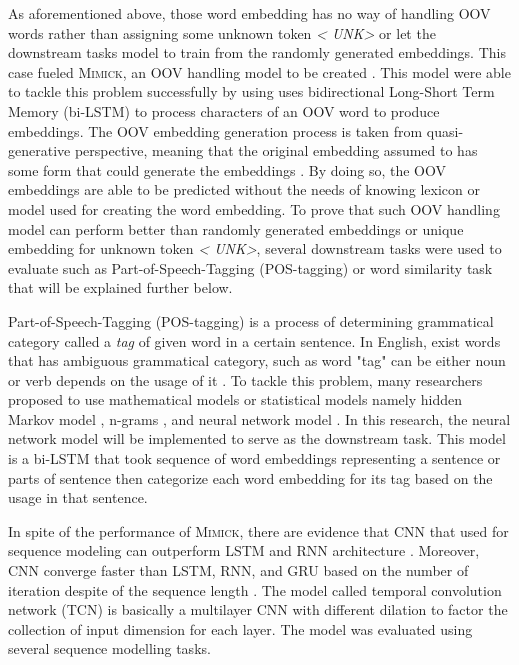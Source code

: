 As aforementioned above, those word embedding has no way of handling
OOV words rather than assigning some unknown token \textit{\textless
UNK\textgreater} or let the downstream tasks model to train from the
randomly generated embeddings. This case fueled \textsc{Mimick}, an
OOV handling model to be created \citep{mimicking2017Pinter}. This
model were able to tackle this problem successfully by using
uses bidirectional Long-Short Term Memory (bi-LSTM) to process
characters of an OOV word to produce embeddings. The OOV embedding
generation process is taken from quasi-generative perspective, meaning
that the original embedding assumed to has some form that could
generate the embeddings \citep{mimicking2017Pinter}. By doing so, the
OOV embeddings are able to be predicted without the needs of knowing
lexicon or model used for creating the word embedding. To prove that
such OOV handling model can perform better than randomly generated
embeddings or unique embedding for unknown token \textit{\textless
UNK\textgreater}, several downstream tasks were used to evaluate such
as Part-of-Speech-Tagging (POS-tagging) or word similarity task that
will be explained further below.

Part-of-Speech-Tagging (POS-tagging) is a process of determining
grammatical category called a \textit{tag} of given word in a certain
sentence. In English, exist words that has ambiguous grammatical
category, such as word "tag" can be either noun or verb depends on the
usage of it \citep{apractical1992cutting}. To tackle this problem,
many researchers proposed to use mathematical models or statistical
models namely hidden Markov model \citep{apractical1992cutting},
n-grams \citep{tnt2000Brants}, and neural network model
\citep{finding2015ling}. In this research, the neural network model
will be implemented to serve as the downstream task. This model is a
bi-LSTM that took sequence of word embeddings representing a sentence
or parts of sentence then categorize each word embedding for its tag
based on the usage in that sentence.

In spite of the performance of \textsc{Mimick}, there are evidence
that CNN that used for sequence modeling can outperform LSTM and RNN
architecture \citep{empirical2018shaujie}. Moreover, CNN converge
faster than LSTM, RNN, and GRU based on the number of iteration
despite of the sequence length \citep{empirical2018shaujie}. The model
called temporal convolution network (TCN) is basically a multilayer
CNN with different dilation to factor the collection of input
dimension for each layer. The model was evaluated using several
sequence modelling tasks.

